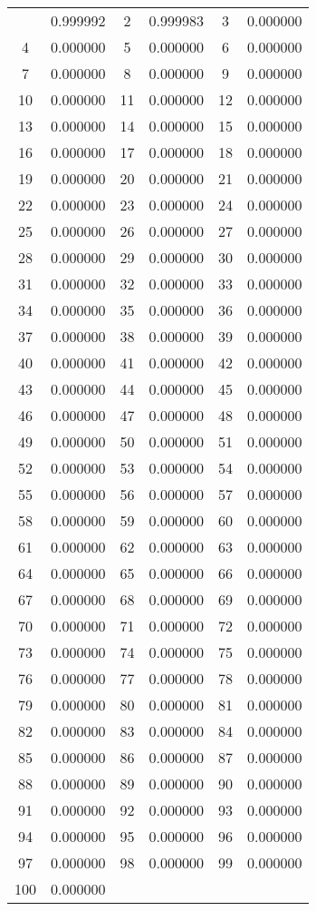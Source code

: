 \documentclass[12pt]{article}
\begin{document}
\begin{longtable}{@{}cc|cc|cc@{}}
\bottomrule
\endlastfoot
1 & 0.999992 & 2 & 0.999983 & 3 & 0.000000 \\
4 & 0.000000 & 5 & 0.000000 & 6 & 0.000000 \\
7 & 0.000000 & 8 & 0.000000 & 9 & 0.000000 \\
10 & 0.000000 & 11 & 0.000000 & 12 & 0.000000 \\
13 & 0.000000 & 14 & 0.000000 & 15 & 0.000000 \\
16 & 0.000000 & 17 & 0.000000 & 18 & 0.000000 \\
19 & 0.000000 & 20 & 0.000000 & 21 & 0.000000 \\
22 & 0.000000 & 23 & 0.000000 & 24 & 0.000000 \\
25 & 0.000000 & 26 & 0.000000 & 27 & 0.000000 \\
28 & 0.000000 & 29 & 0.000000 & 30 & 0.000000 \\
31 & 0.000000 & 32 & 0.000000 & 33 & 0.000000 \\
34 & 0.000000 & 35 & 0.000000 & 36 & 0.000000 \\
37 & 0.000000 & 38 & 0.000000 & 39 & 0.000000 \\
40 & 0.000000 & 41 & 0.000000 & 42 & 0.000000 \\
43 & 0.000000 & 44 & 0.000000 & 45 & 0.000000 \\
46 & 0.000000 & 47 & 0.000000 & 48 & 0.000000 \\
49 & 0.000000 & 50 & 0.000000 & 51 & 0.000000 \\
52 & 0.000000 & 53 & 0.000000 & 54 & 0.000000 \\
55 & 0.000000 & 56 & 0.000000 & 57 & 0.000000 \\
58 & 0.000000 & 59 & 0.000000 & 60 & 0.000000 \\
61 & 0.000000 & 62 & 0.000000 & 63 & 0.000000 \\
64 & 0.000000 & 65 & 0.000000 & 66 & 0.000000 \\
67 & 0.000000 & 68 & 0.000000 & 69 & 0.000000 \\
70 & 0.000000 & 71 & 0.000000 & 72 & 0.000000 \\
73 & 0.000000 & 74 & 0.000000 & 75 & 0.000000 \\
76 & 0.000000 & 77 & 0.000000 & 78 & 0.000000 \\
79 & 0.000000 & 80 & 0.000000 & 81 & 0.000000 \\
82 & 0.000000 & 83 & 0.000000 & 84 & 0.000000 \\
85 & 0.000000 & 86 & 0.000000 & 87 & 0.000000 \\
88 & 0.000000 & 89 & 0.000000 & 90 & 0.000000 \\
91 & 0.000000 & 92 & 0.000000 & 93 & 0.000000 \\
94 & 0.000000 & 95 & 0.000000 & 96 & 0.000000 \\
97 & 0.000000 & 98 & 0.000000 & 99 & 0.000000 \\
100 & 0.000000 &  &  &  &  \\

\end{longtable}
\end{document}

